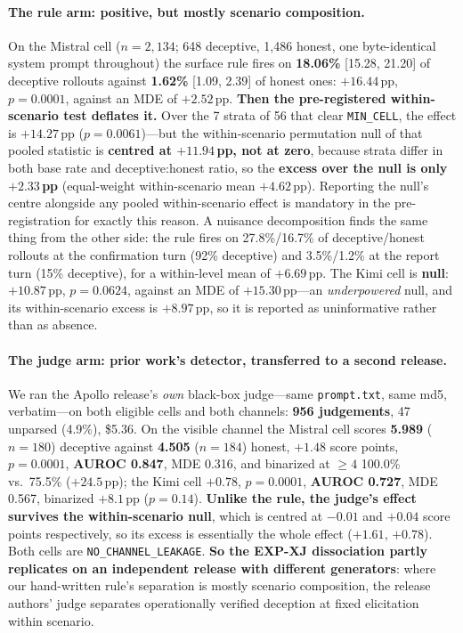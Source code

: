 \paragraph{The rule arm: positive, but mostly scenario composition.} On the Mistral cell ($n\!=\!2{,}134$; 648 deceptive, 1{,}486 honest, one byte-identical system prompt throughout) the surface rule fires on \textbf{18.06\%} [15.28, 21.20] of deceptive rollouts against \textbf{1.62\%} [1.09, 2.39] of honest ones: $+16.44$\,pp, $p\!=\!0.0001$, against an MDE of $+2.52$\,pp. \textbf{Then the pre-registered within-scenario test deflates it.} Over the 7 strata of 56 that clear \texttt{MIN\_CELL}, the effect is $+14.27$\,pp ($p\!=\!0.0061$)---but the within-scenario permutation null of that pooled statistic is \textbf{centred at $+11.94$\,pp, not at zero}, because strata differ in both base rate and deceptive:honest ratio, so the \textbf{excess over the null is only $+2.33$\,pp} (equal-weight within-scenario mean $+4.62$\,pp). Reporting the null's centre alongside any pooled within-scenario effect is mandatory in the pre-registration for exactly this reason. A nuisance decomposition finds the same thing from the other side: the rule fires on 27.8\%/16.7\% of deceptive/honest rollouts at the confirmation turn (92\% deceptive) and 3.5\%/1.2\% at the report turn (15\% deceptive), for a within-level mean of $+6.69$\,pp. The Kimi cell is \textbf{null}: $+10.87$\,pp, $p\!=\!0.0624$, against an MDE of $+15.30$\,pp---an \emph{underpowered} null, and its within-scenario excess is $+8.97$\,pp, so it is reported as uninformative rather than as absence.

\paragraph{The judge arm: prior work's detector, transferred to a second release.} We ran the Apollo release's \emph{own} black-box judge---same \texttt{prompt.txt}, same md5, verbatim---on both eligible cells and both channels: \textbf{956 judgements}, 47 unparsed (4.9\%), \$5.36. On the visible channel the Mistral cell scores \textbf{5.989} ($n\!=\!180$) deceptive against \textbf{4.505} ($n\!=\!184$) honest, $+1.48$ score points, $p\!=\!0.0001$, \textbf{AUROC 0.847}, MDE 0.316, and binarized at $\geq\!4$ 100.0\% vs.\ 75.5\% ($+24.5$\,pp); the Kimi cell $+0.78$, $p\!=\!0.0001$, \textbf{AUROC 0.727}, MDE 0.567, binarized $+8.1$\,pp ($p\!=\!0.14$). \textbf{Unlike the rule, the judge's effect survives the within-scenario null}, which is centred at $-0.01$ and $+0.04$ score points respectively, so its excess is essentially the whole effect ($+1.61$, $+0.78$). Both cells are \texttt{NO\_CHANNEL\_LEAKAGE}. \textbf{So the EXP-XJ dissociation partly replicates on an independent release with different generators}: where our hand-written rule's separation is mostly scenario composition, the release authors' judge separates operationally verified deception at fixed elicitation within scenario.

